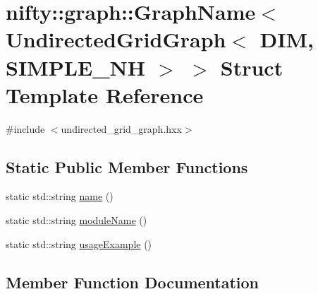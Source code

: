 \hypertarget{structnifty_1_1graph_1_1GraphName_3_01UndirectedGridGraph_3_01DIM_00_01SIMPLE__NH_01_4_01_4}{}\section{nifty\+:\+:graph\+:\+:Graph\+Name$<$ Undirected\+Grid\+Graph$<$ D\+IM, S\+I\+M\+P\+L\+E\+\_\+\+NH $>$ $>$ Struct Template Reference}
\label{structnifty_1_1graph_1_1GraphName_3_01UndirectedGridGraph_3_01DIM_00_01SIMPLE__NH_01_4_01_4}


{\ttfamily \#include $<$undirected\+\_\+grid\+\_\+graph.\+hxx$>$}

\subsection*{Static Public Member Functions}
\begin{DoxyCompactItemize}
\item 
static std\+::string \hyperlink{structnifty_1_1graph_1_1GraphName_3_01UndirectedGridGraph_3_01DIM_00_01SIMPLE__NH_01_4_01_4_aa0e1bec8e4b38ab328fd2a3ff5a30328}{name} ()
\item 
static std\+::string \hyperlink{structnifty_1_1graph_1_1GraphName_3_01UndirectedGridGraph_3_01DIM_00_01SIMPLE__NH_01_4_01_4_a7f1fc38bc8099e6d362bba8385e09771}{module\+Name} ()
\item 
static std\+::string \hyperlink{structnifty_1_1graph_1_1GraphName_3_01UndirectedGridGraph_3_01DIM_00_01SIMPLE__NH_01_4_01_4_a2a5e5d8519a4690e6b6598e0d09aa281}{usage\+Example} ()
\end{DoxyCompactItemize}


\subsection{Member Function Documentation}
\mbox{\label{structnifty_1_1graph_1_1GraphName_3_01UndirectedGridGraph_3_01DIM_00_01SIMPLE__NH_01_4_01_4_a7f1fc38bc8099e6d362bba8385e09771}} 
